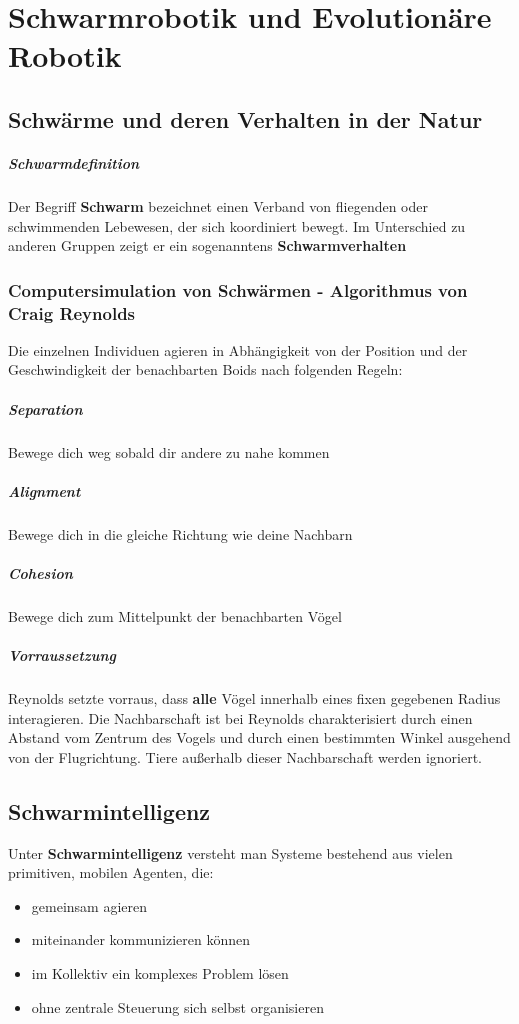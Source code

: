 \chapter{Schwarmrobotik und Evolutionäre Robotik}
\section{Schwärme  und deren Verhalten in der Natur}
\paragraph{Schwarmdefinition}
Der Begriff \textbf{Schwarm} bezeichnet einen Verband von fliegenden oder schwimmenden Lebewesen, der sich koordiniert bewegt.
Im Unterschied zu anderen Gruppen zeigt er ein sogenanntens \textbf{Schwarmverhalten}
\subsection{Computersimulation von Schwärmen - Algorithmus von Craig Reynolds}
Die einzelnen Individuen agieren in Abhängigkeit von der Position und der Geschwindigkeit der benachbarten Boids nach folgenden Regeln:
\paragraph{Separation} Bewege dich weg sobald dir andere zu nahe kommen
\paragraph{Alignment} Bewege dich in die gleiche Richtung wie deine Nachbarn
\paragraph{Cohesion} Bewege dich zum Mittelpunkt der benachbarten Vögel
\paragraph{Vorraussetzung}
Reynolds setzte vorraus, dass \textbf{alle} Vögel innerhalb eines fixen gegebenen Radius interagieren.
Die Nachbarschaft ist bei Reynolds charakterisiert durch einen Abstand vom Zentrum des Vogels und durch einen bestimmten Winkel ausgehend von der Flugrichtung.
Tiere außerhalb dieser Nachbarschaft werden ignoriert.
\section{Schwarmintelligenz}
Unter \textbf{Schwarmintelligenz} versteht man Systeme bestehend aus vielen primitiven, mobilen Agenten, die:
\begin{itemize}
	\item gemeinsam agieren
	\item miteinander kommunizieren können
	\item im Kollektiv ein komplexes Problem lösen
	\item ohne zentrale Steuerung sich selbst organisieren
\end{itemize}
